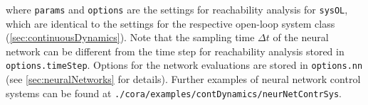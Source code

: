 where \texttt{params} and \texttt{options} are the settings for reachability analysis for \texttt{sysOL},
which are identical to the settings for the respective open-loop system class (\cref{sec:continuousDynamics}).
Note that the sampling time $\Delta t$ of the neural network can be different from the time step for reachability analysis stored in \texttt{options.timeStep}.
Options for the network evaluations are stored in \texttt{options.nn} (see \cref{sec:neuralNetworks} for details).
Further examples of neural network control systems can be found at \texttt{./cora/examples/contDynamics/neurNetContrSys}.